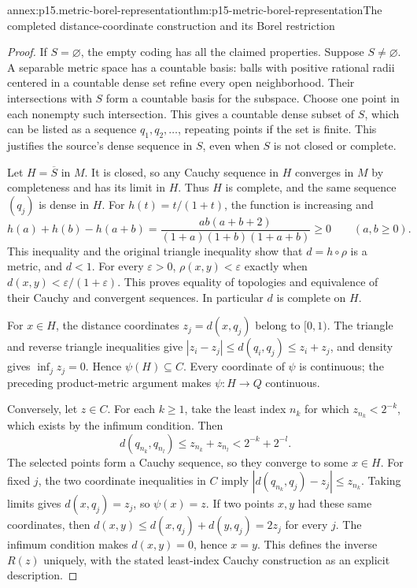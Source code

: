 \begin{annexitem}{annex:p15.metric-borel-representation}{thm:p15-metric-borel-representation}{The completed distance-coordinate construction and its Borel restriction}
\begin{proof}
If \(S=\varnothing\), the empty coding has all the claimed
properties. Suppose \(S\ne\varnothing\). A separable metric
space has a countable basis: balls with positive rational radii
centered in a countable dense set refine every open neighborhood.
Their intersections with \(S\) form a countable basis for
the subspace. Choose one point in each nonempty such intersection.
This gives a countable dense subset of \(S\), which can be
listed as a sequence \(q_1,q_2,\ldots\), repeating points
if the set is finite. This justifies the source's dense sequence
in \(S\), even when \(S\) is not closed or complete.

Let \(H=\overline S\) in \(M\). It is closed, so any
Cauchy sequence in \(H\) converges in \(M\) by completeness
and has its limit in \(H\). Thus \(H\) is complete, and
the same sequence \((q_j)\) is dense in \(H\).
For \(h(t)=t/(1+t)\), the function is increasing and
\[
 h(a)+h(b)-h(a+b)
   =\frac{ab(a+b+2)}{(1+a)(1+b)(1+a+b)}\geq0
                    \qquad(a,b\geq0).
\]
This inequality and the original triangle inequality show that
\(d=h\circ\rho\) is a metric, and \(d<1\).
For every \(\varepsilon>0\),
\(\rho(x,y)<\varepsilon\) exactly when
\(d(x,y)<\varepsilon/(1+\varepsilon)\).
This proves equality of topologies and equivalence of their
Cauchy and convergent sequences. In particular \(d\) is
complete on \(H\).

For \(x\in H\), the distance coordinates \(z_j=d(x,q_j)\)
belong to \([0,1)\). The triangle and reverse triangle
inequalities give
\( |z_i-z_j|\leq d(q_i,q_j)\leq z_i+z_j\),
and density gives \(\inf_jz_j=0\). Hence \(\psi(H)\subseteq C\).
Every coordinate of \(\psi\) is continuous; the preceding
product-metric argument makes \(\psi:H\to Q\) continuous.

Conversely, let \(z\in C\). For each \(k\geq1\), take
the least index \(n_k\) for which \(z_{n_k}<2^{-k}\),
which exists by the infimum condition. Then
\[
 d(q_{n_k},q_{n_l})\leq z_{n_k}+z_{n_l}<2^{-k}+2^{-l}.
\]
The selected points form a Cauchy sequence, so they converge
to some \(x\in H\). For fixed \(j\), the two coordinate
inequalities in \(C\) imply
\( |d(q_{n_k},q_j)-z_j|\leq z_{n_k}\).
Taking limits gives \(d(x,q_j)=z_j\), so \(\psi(x)=z\).
If two points \(x,y\) had these same coordinates, then
\(d(x,y)\leq d(x,q_j)+d(y,q_j)=2z_j\) for every \(j\).
The infimum condition makes \(d(x,y)=0\), hence \(x=y\).
This defines the inverse \(R(z)\) uniquely, with the stated
least-index Cauchy construction as an explicit description.


\end{proof}
\end{annexitem}
